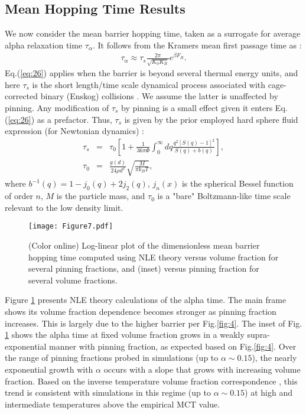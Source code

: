 \documentclass[twocolumn,showpacs,preprintnumbers,amsmath,amssymb,unsortedaddress,
]{revtex4-1}
\begin{document}
\subsection{Mean Hopping Time Results}
We now consider the mean barrier hopping time, taken as a surrogate for average alpha relaxation time $\tau_\alpha$. It follows from the Kramers mean first passage time as \cite{7,46}:
\begin{eqnarray}
\tau_\alpha \approx \tau_s\frac{2\pi}{\sqrt{K_0K_B}}e^{\beta F_B}.
\label{eq:26}
\end{eqnarray}
Eq.(\ref{eq:26}) applies when the barrier is beyond several thermal energy units, and here $\tau_s$ is the short length/time scale dynamical process associated with cage-corrected binary (Enskog) collisions \cite{7,33}. We assume the latter is unaffected by pinning. Any modification of $\tau_s$ by pinning is a small effect given it enters Eq.(\ref{eq:26}) as a prefactor. Thus, $\tau_s$ is given by the prior employed hard sphere fluid expression (for Newtonian dynamics) \cite{7}:
\begin{eqnarray}
\tau_s &=& \tau_0\left[1+\frac{1}{36\pi\Phi}\int_{0}^{\infty}dq \frac{q^2\left[ S(q)-1 \right]^2}{S(q)+b(q)} \right], \nonumber\\
\tau_0 &=& \frac{g(d)}{24\rho d^2}\sqrt{\frac{M}{\pi k_BT}},
\label{eq:short}
\end{eqnarray}
where $b^{-1}(q) = 1-j_0(q)+2j_2(q)$, $j_n(x)$ is the spherical Bessel function of order $n$, $M$ is the particle mass, and $\tau_0$ is a "bare" Boltzmann-like time scale relevant to the low density limit.

\begin{figure}[htp]
\center
\texttt{[image: Figure7.pdf]}
\caption{\label{fig:7}(Color online) Log-linear plot of the dimensionless mean barrier hopping time computed using NLE theory versus volume fraction for several pinning fractions, and (inset) versus pinning fraction for several volume fractions.}
\end{figure}

Figure \ref{fig:7} presents NLE theory calculations of the alpha time. The main frame shows its volume fraction dependence becomes stronger as pinning fraction increases. This is largely due to the higher barrier per Fig.\ref{fig:4}. The inset of Fig. \ref{fig:7} shows the alpha time at fixed volume fraction grows in a weakly supra-exponential manner with pinning fraction, as expected based on Fig.\ref{fig:4}. Over the range of pinning fractions probed in simulations (up to $\alpha\sim0.15$), the nearly exponential growth with $\alpha$ occurs with a slope that grows with increasing volume fraction. Based on the inverse temperature volume fraction correspondence \cite{3,40}, this trend is consistent with simulations in this regime (up to $\alpha\sim0.15$) at high and intermediate temperatures above the empirical MCT value.
\end{document}
